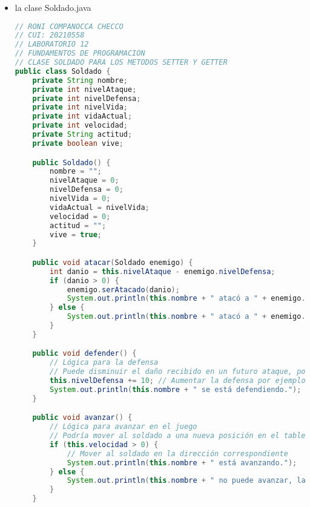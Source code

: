 \documentclass{article}
\begin{document}
\begin{itemize}
\begin{itemize}
\begin{lstlisting}[language=java]
    // METODO QUE NOS AYUDA A ORDENAR LOS SOLDADOS DE ACUERDO A SU NIVEL DE VIDA, EN ESTA OCACION DIFERENTE A LA ANTERIOR QUE ERA ALGORITMO DE BURBUJA
    public static void ordenarPorVidaMetodoB(ArrayList<Soldado> soldadito) {
        Collections.sort(soldadito, new Comparator<Soldado>() {
            public int compare(Soldado s1, Soldado s2) {
                // Orden descendente por puntos de vida
                return Integer.compare(s2.getPuntos(), s1.getPuntos());
            }
        });
    }
}
        \end{lstlisting}

        \item la clase Soldado.java
        \begin{lstlisting}[language=java]
// RONI COMPANOCCA CHECCO
// CUI: 20210558
// LABORATORIO 12
// FUNDAMENTOS DE PROGRAMACION 
// CLASE SOLDADO PARA LOS METODOS SETTER Y GETTER
public class Soldado {
    private String nombre;
    private int nivelAtaque;
    private int nivelDefensa;
    private int nivelVida;
    private int vidaActual;
    private int velocidad;
    private String actitud;
    private boolean vive;

    public Soldado() {
        nombre = "";
        nivelAtaque = 0;
        nivelDefensa = 0;
        nivelVida = 0;
        vidaActual = nivelVida;
        velocidad = 0;
        actitud = "";
        vive = true;
    }

    public void atacar(Soldado enemigo) {
        int danio = this.nivelAtaque - enemigo.nivelDefensa;
        if (danio > 0) {
            enemigo.serAtacado(danio);
            System.out.println(this.nombre + " atacó a " + enemigo.nombre + " y le causó " + danio + " de daño.");
        } else {
            System.out.println(this.nombre + " atacó a " + enemigo.nombre + " pero no le causó daño.");
        }
    }

    public void defender() {
        // Lógica para la defensa
        // Puede disminuir el daño recibido en un futuro ataque, por ejemplo
        this.nivelDefensa += 10; // Aumentar la defensa por ejemplo
        System.out.println(this.nombre + " se está defendiendo.");
    }

    public void avanzar() {
        // Lógica para avanzar en el juego
        // Podría mover al soldado a una nueva posición en el tablero, por ejemplo
        if (this.velocidad > 0) {
            // Mover al soldado en la dirección correspondiente
            System.out.println(this.nombre + " está avanzando.");
        } else {
            System.out.println(this.nombre + " no puede avanzar, la velocidad es 0.");
        }
    }


\end{lstlisting}
\end{itemize}
\end{itemize}
\end{document}
